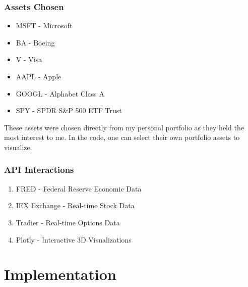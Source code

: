 \documentclass{article}
\begin{document}
\subsubsection {Assets Chosen}
\begin{itemize}
\item MSFT - Microsoft
\item BA - Boeing
\item V - Visa 
\item AAPL - Apple
\item GOOGL - Alphabet Class A
\item SPY -  SPDR S&P 500 ETF Trust
\end{itemize}
\begin{flushleft} 
These assets were chosen directly from my personal portfolio as they held the most interest to me. In the code, one can select their own portfolio assets to visualize. 
\end{flushleft}
\subsubsection {API Interactions}
\begin{enumerate}
\item FRED - Federal Reserve Economic Data
\item IEX Exchange - Real-time Stock Data 
\item Tradier - Real-time Options Data
\item Plotly - Interactive 3D Visualizations
\end{enumerate}

\newpage
\section{Implementation}
\end{document}
